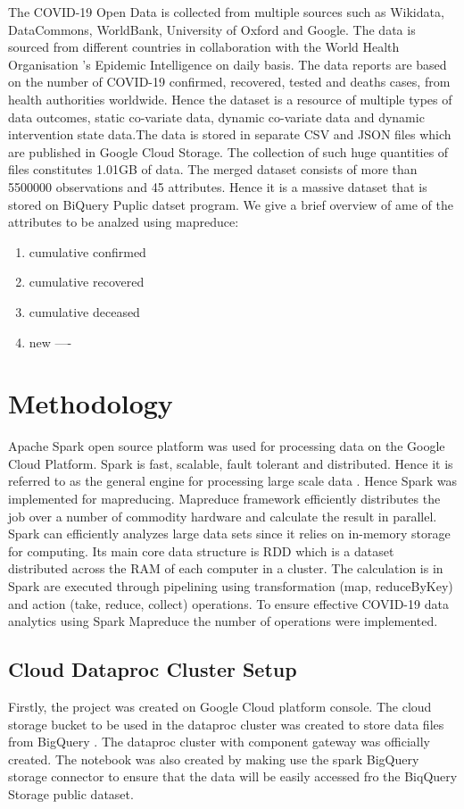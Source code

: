 \documentclass[12pt,letterpaper, twoside]{article}
\begin{document}
The COVID-19 Open Data is collected from multiple sources such as Wikidata, DataCommons, WorldBank, University of Oxford and Google. The data is sourced from different countries in collaboration with the World Health Organisation 's Epidemic Intelligence on daily basis. The data reports are based on the number of COVID-19  confirmed, recovered, tested and deaths cases, from health authorities worldwide. Hence the dataset is a resource of multiple types of data outcomes, static co-variate data, dynamic co-variate data and dynamic intervention state data\cite{covid-19}.The data is stored in separate CSV and JSON files which are published in Google Cloud Storage. The collection of such huge quantities of files constitutes 1.01GB of data.  The merged dataset consists of more than 5500000 observations and 45 attributes. Hence it is a massive dataset that is stored on BiQuery Puplic datset program.
We give a brief overview of ame of the attributes to be analzed using mapreduce:
\begin{enumerate}
    \item cumulative confirmed
    \item cumulative recovered
    \item cumulative deceased
    \item new ----
\end{enumerate}

\section{Methodology}
Apache Spark open source platform was used for processing data on the Google Cloud Platform. Spark is fast, scalable, fault tolerant and distributed. Hence it is referred to as the general engine for processing large scale data  \cite{Chouksey and Chauhan, 2017}. Hence Spark was implemented for mapreducing. Mapreduce framework efficiently distributes the job over a number of commodity hardware and calculate the result in parallel. Spark can efficiently analyzes large data sets since it relies on in-memory storage for computing. Its main core data structure is RDD which is a dataset distributed across the RAM  of each computer in a cluster. The calculation is in Spark are executed through pipelining using transformation (map, reduceByKey) and action (take, reduce, collect) operations. To ensure effective COVID-19 data analytics using Spark Mapreduce the number of operations were implemented.

\subsection{Cloud Dataproc Cluster Setup}
Firstly, the project was created on Google Cloud platform console. The cloud storage bucket to be used in the dataproc cluster was created to store data files from BigQuery . The dataproc cluster with component gateway was officially created. The notebook was also created by making use the spark BigQuery storage connector to ensure that the data will be easily accessed fro the BiqQuery Storage public dataset. 
\end{document}
